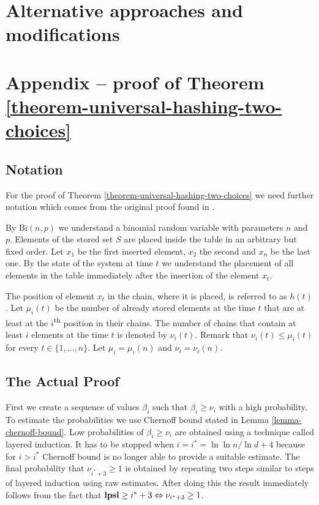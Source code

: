 \documentclass[runningheads,a4paper]{llncs}
\begin{document}
\section{Alternative approaches and modifications}
\label{section-alternatives}




\section*{Appendix -- proof of Theorem \ref{theorem-universal-hashing-two-choices}}
\subsection{Notation}
For the proof of Theorem \ref{theorem-universal-hashing-two-choices} we need further notation which comes from the original proof found in \cite{Mitzenmacher:2005:PCR:1076315}. 

By $\mathrm{Bi}(n, p)$ we understand a binomial random variable with parameters $n$ and $p$.
Elements of the stored set $S$ are placed inside the table in an arbitrary but fixed order. Let $x_1$ be the first inserted element, $x_2$ the second and $x_n$ be the last one.
By the state of the system at time $t$ we understand the placement of all elements in the table immediately after the insertion of the element $x_t$. 

The position of element $x_t$ in the chain, where it is placed, is referred to as $h(t)$. Let $\mu_i(t)$ be the number of already stored elements at the time $t$ that are at least at the $i$\textsuperscript{th} position in their chains. The number of chains that contain at least $i$ elements at the time $t$ is denoted by $\nu_i(t)$. Remark that $\nu_i(t) \leq \mu_i(t)$ for every $t \in \{1, \dots, n \}$. Let $\mu_i = \mu_i(n)$ and $\nu_i = \nu_i(n)$.

\subsection{The Actual Proof}
First we create a sequence of values $\beta_i$ such that $\beta_i \geq \nu_i$ with a high probability. To estimate the probabilities we use Chernoff bound stated in Lemma \ref{lemma-chernoff-bound}. Low probabilities of $\beta_i \geq \nu_i$ are obtained using a technique called layered induction. It has to be stopped when $i = i^* = \ln \ln n/\ln d + 4$ because for $i > i^*$ Chernoff bound is no longer able to provide a suitable estimate. The final probability that $\nu_{i^*+3} \geq 1$ is obtained by repeating two steps similar to steps of layered induction using raw estimates. After doing this the result immediately follows from the fact that $\mathbf{lpsl} \geq i^*+3 \Leftrightarrow \nu_{i^* + 3} \geq 1$.
\end{document}
